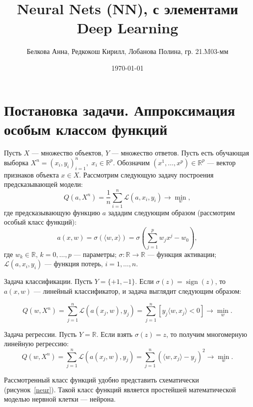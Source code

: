 \documentclass{article}
\title{Neural Nets (NN), с элементами Deep Learning}
\author{Белкова Анна, Редкокош Кирилл, Лобанова Полина, гр. 21.M03-мм}
\date{\today}
\DeclareMathOperator{\sign}{sign}
\begin{document}
	\maketitle
	\tableofcontents
	\newpage
	
	\section{Постановка задачи. Аппроксимация особым классом функций}
	
	Пусть $X$ --- множество объектов, $Y$ --- множество ответов. Пусть есть обучающая выборка $X^n = (x_i, y_i)_{i=1}^{n},$ $x_i \in \mathbb{R}^p$. Обозначим $(x^1,\ldots,x^p)\in \mathbb{R}^p$ --- вектор признаков объекта $x\in X$. Рассмотрим следующую задачу построения предсказывающей модели:
	\begin{equation*}
		Q(a, X^n) = \frac{1}{n} \sum_{i=1}^{n} \mathcal{L}(a,x_i,y_i) \rightarrow \min_w,
	\end{equation*}
	где предсказывающую функцию $a$ зададим следующим образом (рассмотрим особый класс функций):
	\begin{equation*}
		a(x, w) = \sigma( \langle w,x \rangle ) = \sigma\left(\sum_{j=1}^{p} w_j x^j - w_0 \right),
	\end{equation*}
	где $w_k \in \mathbb{R}$, $k=0,\ldots,p$ --- параметры; 
	$\sigma: \mathbb{R} \rightarrow  \mathbb{R} $ --- функция активации;
	$\mathcal{L}(a,x_i,y_i)$ --- функция потерь, $i=1,\ldots,n$.
	
	Задача классификации. Пусть $Y=\{+1,-1\}$. Если $\sigma (z)=\sign (z)$, то $a(x,w)$ --- линейный классификатор, и задача выглядит следующим образом: 
	
	\begin{equation*}
		Q(w, X^{n})=\sum_{j=1}^{n} \mathcal{L} \left( a(x_j ,w), y_j \right) = \sum_{j=1}^{n} [y_j \langle w,x_j \rangle  < 0] \rightarrow \min_{w}.
	\end{equation*}
	
	Задача регрессии. Пусть $Y=\mathbb{R}$. Если взять $\sigma(z)=z$, то получим многомерную линейную регрессию:
	\begin{equation*}
		Q(w, X^{n})=\sum_{j=1}^{n} \mathcal{L} \left( a( x_j,w ), y_j \right)=\sum_{j=1}^{n}\left( \langle w,x_j \rangle  -y_j \right)^2 \rightarrow \min_{w}.
	\end{equation*}
	
	Рассмотренный класс функций удобно представить схематически (рисунок~\ref{neur}). Такой класс функций является простейшей математической моделью нервной клетки --- нейрона.
	
\end{document}
